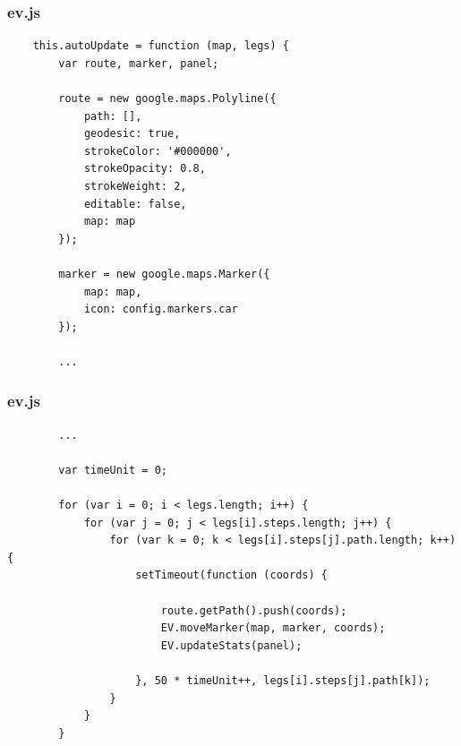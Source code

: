 \begin{frame}[fragile]
\frametitle{ev.js}

\begin{verbatim}
    this.autoUpdate = function (map, legs) {
        var route, marker, panel;

        route = new google.maps.Polyline({
            path: [],
            geodesic: true,
            strokeColor: '#000000',
            strokeOpacity: 0.8,
            strokeWeight: 2,
            editable: false,
            map: map
        });

        marker = new google.maps.Marker({
            map: map,
            icon: config.markers.car
        });

        ...
\end{verbatim}

\end{frame}
\clearpage



\begin{frame}[fragile]
\frametitle{ev.js}

\begin{verbatim}
        ...

        var timeUnit = 0;

        for (var i = 0; i < legs.length; i++) {
            for (var j = 0; j < legs[i].steps.length; j++) {
                for (var k = 0; k < legs[i].steps[j].path.length; k++) {
                    setTimeout(function (coords) {

                        route.getPath().push(coords);
                        EV.moveMarker(map, marker, coords);
                        EV.updateStats(panel);

                    }, 50 * timeUnit++, legs[i].steps[j].path[k]);
                }
            }
        }
\end{verbatim}

\end{frame}
\clearpage